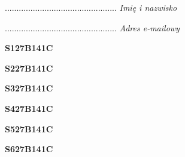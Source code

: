 \begin{turn}{90}\begin{minipage}{\linewidth} \vspace{20mm} ................................................  \textit{Imię i nazwisko}\end{minipage}\end{turn}

\begin{turn}{90}\begin{minipage}{\linewidth} \vspace{20mm} ................................................  \textit{Adres e-mailowy}\end{minipage}\end{turn}

\begin{turn}{90}\huge \begin{minipage}{\linewidth} \vspace{10mm}\textbf{S127B141C}\end{minipage}\end{turn}

\begin{turn}{90}\huge \begin{minipage}{\linewidth} \vspace{10mm}\textbf{S227B141C}\end{minipage}\end{turn}

\begin{turn}{90}\huge \begin{minipage}{\linewidth} \vspace{10mm}\textbf{S327B141C}\end{minipage}\end{turn}

\begin{turn}{90}\huge \begin{minipage}{\linewidth} \vspace{10mm}\textbf{S427B141C}\end{minipage}\end{turn}

\begin{turn}{90}\huge \begin{minipage}{\linewidth} \vspace{10mm}\textbf{S527B141C}\end{minipage}\end{turn}

\begin{turn}{90}\huge \begin{minipage}{\linewidth} \vspace{10mm}\textbf{S627B141C}\end{minipage}\end{turn}

